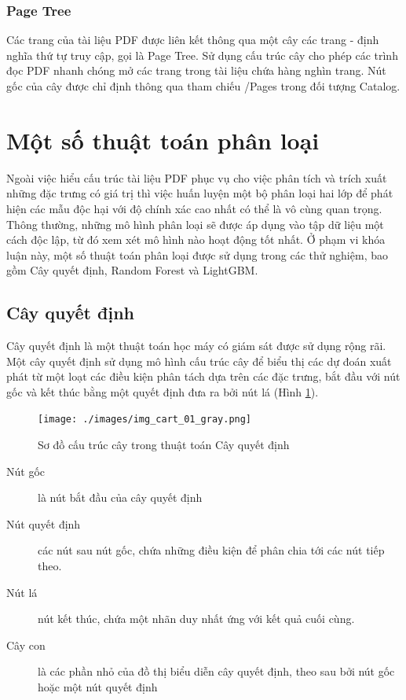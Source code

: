\documentclass[./../main.tex]{subfiles}
\begin{document}
\subsubsection*{Page Tree}
Các trang của tài liệu PDF được liên kết thông qua một cây các trang - định nghĩa thứ tự truy cập, gọi là Page Tree. Sử dụng cấu trúc cây cho phép các trình đọc PDF nhanh chóng mở các trang trong tài liệu chứa hàng nghìn trang. Nút gốc của cây được chỉ định thông qua tham chiếu /Pages trong đối tượng Catalog.



\section{Một số thuật toán phân loại}

Ngoài việc hiểu cấu trúc tài liệu PDF phục vụ cho việc phân tích và trích xuất những đặc trưng có giá trị thì việc huấn luyện một bộ phân loại hai lớp để phát hiện các mẫu độc hại với độ chính xác cao nhất có thể là vô cùng quan trọng. Thông thường, những mô hình phân loại sẽ được áp dụng vào tập dữ liệu một cách độc lập, từ đó xem xét mô hình nào hoạt động tốt nhất. Ở phạm vi khóa luận này, một số thuật toán phân loại được sử dụng trong các thử nghiệm, bao gồm Cây quyết định, Random Forest và LightGBM.

\subsection{Cây quyết định}
Cây quyết định là một thuật toán học máy có giám sát được sử dụng rộng rãi. Một cây quyết định sử dụng mô hình cấu trúc cây để biểu thị các dự đoán xuất phát từ một loạt các điều kiện phân tách dựa trên các đặc trưng, bắt đầu với nút gốc và kết thúc bằng một quyết định đưa ra bởi nút lá (Hình \ref{fig:img_cart_01_gray}).

\begin{figure}[ht!]
	\centering
	\texttt{[image: ./images/img\_cart\_01\_gray.png]}
	\caption{Sơ đồ cấu trúc cây trong thuật toán Cây quyết định}
	\label{fig:img_cart_01_gray}
\end{figure}

\begin{description}
	\item[Nút gốc] là nút bắt đầu của cây quyết định
	\item[Nút quyết định] các nút sau nút gốc, chứa những điều kiện để phân chia tới các nút tiếp theo.
	\item[Nút lá] nút kết thúc, chứa một nhãn duy nhất ứng với kết quả cuối cùng.
	\item[Cây con] là các phần nhỏ của đồ thị biểu diễn cây quyết định, theo sau bởi nút gốc hoặc một nút quyết định
\end{description}
\end{document}
